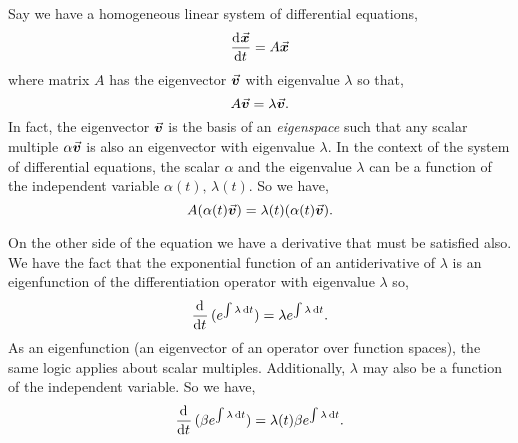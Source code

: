 \documentclass[../MathsNotesBase.tex]{subfiles}
\begin{document}
{		\biggerskip
		\medskip
		Say we have a homogeneous linear system of differential equations,
		\[ \dod{\x}{t} = A \x \]
		where matrix $A$ has the eigenvector $\vec{\bm{v}}$ with eigenvalue $\lambda$ so that,
		\[ A \vec{\bm{v}} = \lambda \vec{\bm{v}}. \]
		In fact, the eigenvector $\vec{\bm{v}}$ is the basis of an \textit{eigenspace} such that any scalar multiple $\alpha \vec{\bm{v}}$ is also an eigenvector with eigenvalue $\lambda$. In the context of the system of differential equations, the scalar $\alpha$ and the eigenvalue $\lambda$ can be a function of the independent variable ${ \alpha(t),\, \lambda(t) }$. So we have,
		\[ A (\alpha(t)\vec{\bm{v}}) = \lambda(t) (\alpha(t)\vec{\bm{v}}). \]
		
		
		\bigskip
		On the other side of the equation we have a derivative that must be satisfied also. We have the fact that the exponential function of an antiderivative of $\lambda$ is an eigenfunction of the differentiation operator with eigenvalue $\lambda$ so,
		\[ \dod{}{t}(e^{\int \lambda \dif t}) = \lambda e^{\int \lambda \dif t}. \]
		As an eigenfunction (an eigenvector of an operator over function spaces), the same logic applies about scalar multiples. Additionally, $\lambda$ may also be a function of the independent variable. So we have,
		\[ \dod{}{t}(\beta e^{\int \lambda \dif t}) = \lambda(t) \beta e^{\int \lambda \dif t}. \]
	
}
\end{document}
